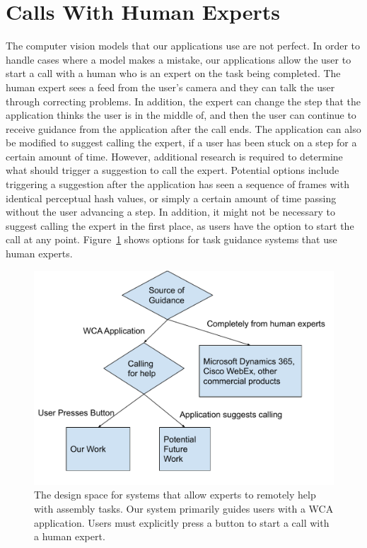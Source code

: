 \section{Calls With Human Experts}

The computer vision models that our applications use are not perfect. In order
to handle cases where a model makes a mistake, our applications allow the user
to start a call with a human who is an expert on the task being completed. The
human expert sees a feed from the user's camera and they can talk the user
through correcting problems. In addition, the expert can change the step that
the application thinks the user is in the middle of, and then the user can
continue to receive guidance from the application after the call ends.
The application can also be modified to suggest calling the expert, if a user
has been stuck on a step for a certain amount of time.
However, additional research is required to determine what should trigger a
suggestion to call the expert.
Potential options include triggering a suggestion after the application has seen
a sequence of frames with identical perceptual hash
values, or simply a certain amount of time passing without the user advancing a
step.
In addition, it might not be necessary to suggest calling the expert in the
first place, as users have the option to start the call at any point.
Figure~\ref{fig:design_space} shows options for task guidance systems that use
human experts.

\begin{figure}[H]
  \includegraphics[width=14cm]{figures/design_space.pdf}
  \caption{The design space for systems that allow experts to remotely help with
    assembly tasks.
    Our system primarily guides users with a WCA application.
    Users must explicitly press a button to start a call with a human expert.
  }\label{fig:design_space}
\end{figure}

